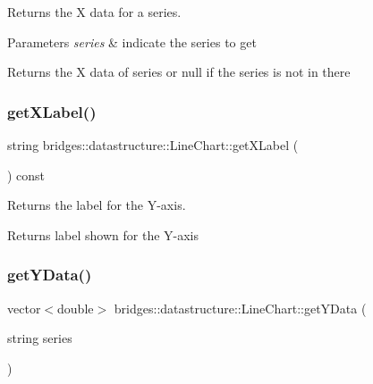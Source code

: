 Returns the X data for a series. 


\begin{DoxyParams}{Parameters}
{\em series} & indicate the series to get \\
\hline
\end{DoxyParams}
\begin{DoxyReturn}{Returns}
the X data of series or null if the series is not in there 
\end{DoxyReturn}
\mbox{\label{classbridges_1_1datastructure_1_1_line_chart_aba75962040195f35f8801714e050ad91}} 
\subsubsection{\texorpdfstring{getXLabel()}{getXLabel()}}
{\footnotesize\ttfamily string bridges\+::datastructure\+::\+Line\+Chart\+::get\+X\+Label (\begin{DoxyParamCaption}{ }\end{DoxyParamCaption}) const\hspace{0.3cm}{\ttfamily [inline]}}



Returns the label for the Y-\/axis. 

\begin{DoxyReturn}{Returns}
label shown for the Y-\/axis 
\end{DoxyReturn}
\mbox{\label{classbridges_1_1datastructure_1_1_line_chart_a6a895cf47836585f8415e4d29e092085}} 
\subsubsection{\texorpdfstring{getYData()}{getYData()}}
{\footnotesize\ttfamily vector$<$double$>$ bridges\+::datastructure\+::\+Line\+Chart\+::get\+Y\+Data (\begin{DoxyParamCaption}\item[{string}]{series }\end{DoxyParamCaption})\hspace{0.3cm}{\ttfamily [inline]}}



